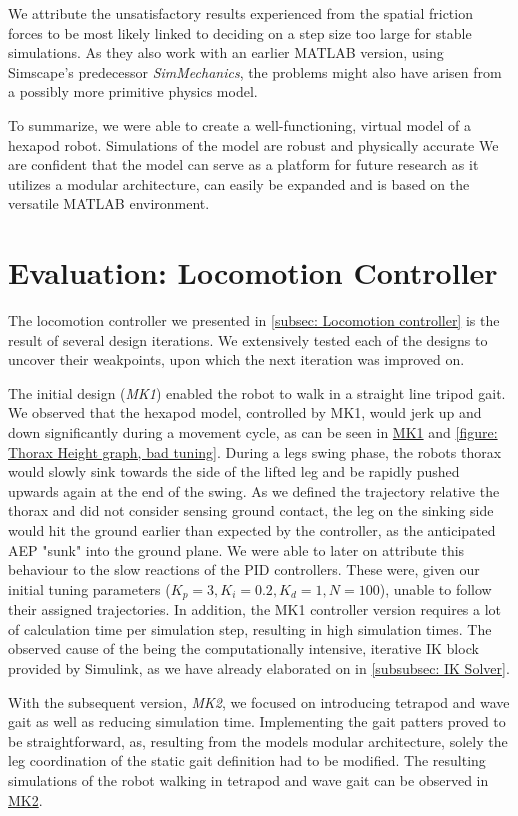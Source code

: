 We attribute the unsatisfactory results \cite{thilderkvist2015motion} experienced from the spatial friction forces to be most likely linked to deciding on a step size too large for stable simulations.
As they also work with an earlier MATLAB version, using Simscape's predecessor \textit{SimMechanics}, the problems might also have arisen from a possibly more primitive physics model.

To summarize, we were able to create a well-functioning, virtual model of a hexapod robot.
Simulations of the model are robust and physically accurate
We are confident that the model can serve as a platform for future research as it utilizes a modular architecture, can easily be expanded and is based on the versatile MATLAB environment.
 

\section{Evaluation: Locomotion Controller}
The locomotion controller we presented in \ref{subsec: Locomotion controller} is the result of several design iterations.
We extensively tested each of the designs to uncover their weakpoints, upon which the next iteration was improved on.

The initial design (\textit{MK1}) enabled the robot to walk in a straight line tripod gait.
We observed that the hexapod model, controlled by MK1, would jerk up and down significantly during a movement cycle, as can be seen in \hyperref[vid: MK1]{MK1} and \ref{figure: Thorax Height graph, bad tuning}.
During a legs swing phase, the robots thorax would slowly sink towards the side of the lifted leg and be rapidly pushed upwards again at the end of the swing.
As we defined the trajectory relative the thorax and did not consider sensing ground contact, the leg on the sinking side would hit the ground earlier than expected by the controller, as the anticipated AEP "sunk" into the ground plane.
We were able to later on attribute this behaviour to the slow reactions of the PID controllers.
These were, given our initial tuning parameters ($K_p = 3, K_i = 0.2, K_d = 1, N = 100$), unable to follow their assigned trajectories. 
In addition, the MK1 controller version requires a lot of calculation time per simulation step, resulting in high simulation times.
The observed cause of the being the computationally intensive, iterative IK block provided by Simulink, as we have already elaborated on in \ref{subsubsec: IK Solver}.

With the subsequent version, \textit{MK2}, we focused on introducing tetrapod and wave gait as well as reducing simulation time.
Implementing the gait patters proved to be straightforward, as, resulting from the models modular architecture, solely the leg coordination of the static gait definition had to be modified.
The resulting simulations of the robot walking in tetrapod and wave gait can be observed in \hyperref[vid: MK1]{MK2}.

